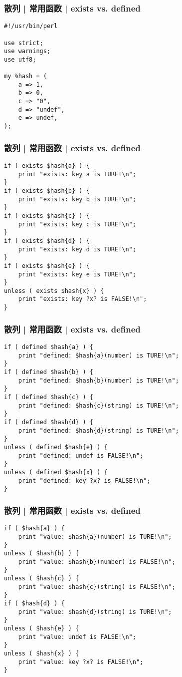 \begin{frame}[fragile]
  \frametitle{散列 | \alert{常用函数} | exists vs. defined}
\begin{lstlisting}
#!/usr/bin/perl 

use strict;
use warnings;
use utf8;

my %hash = (
    a => 1,
    b => 0,
    c => "0",
    d => "undef",
    e => undef,
);
\end{lstlisting}
\end{frame}

\begin{frame}[fragile]
  \frametitle{散列 | \alert{常用函数} | exists vs. defined}
  \vspace{-0.5em}
\begin{lstlisting}[basicstyle=\small\tt]
if ( exists $hash{a} ) {
    print "exists: key a is TURE!\n";
}
if ( exists $hash{b} ) {
    print "exists: key b is TURE!\n";
}
if ( exists $hash{c} ) {
    print "exists: key c is TURE!\n";
}
if ( exists $hash{d} ) {
    print "exists: key d is TURE!\n";
}
if ( exists $hash{e} ) {
    print "exists: key e is TURE!\n";
}
unless ( exists $hash{x} ) {
    print "exists: key ?x? is FALSE!\n";
}
\end{lstlisting}
\end{frame}

\begin{frame}[fragile]
  \frametitle{散列 | \alert{常用函数} | exists vs. defined}
  \vspace{-0.5em}
\begin{lstlisting}[basicstyle=\small\tt]
if ( defined $hash{a} ) {
    print "defined: $hash{a}(number) is TURE!\n";
}
if ( defined $hash{b} ) {
    print "defined: $hash{b}(number) is TURE!\n";
}
if ( defined $hash{c} ) {
    print "defined: $hash{c}(string) is TURE!\n";
}
if ( defined $hash{d} ) {
    print "defined: $hash{d}(string) is TURE!\n";
}
unless ( defined $hash{e} ) {
    print "defined: undef is FALSE!\n";
}
unless ( defined $hash{x} ) {
    print "defined: key ?x? is FALSE!\n";
}
\end{lstlisting}
\end{frame}

\begin{frame}[fragile]
  \frametitle{散列 | \alert{常用函数} | exists vs. defined}
  \vspace{-0.5em}
\begin{lstlisting}[basicstyle=\small\tt]
if ( $hash{a} ) {
    print "value: $hash{a}(number) is TURE!\n";
}
unless ( $hash{b} ) {
    print "value: $hash{b}(number) is FALSE!\n";
}
unless ( $hash{c} ) {
    print "value: $hash{c}(string) is FALSE!\n";
}
if ( $hash{d} ) {
    print "value: $hash{d}(string) is TURE!\n";
}
unless ( $hash{e} ) {
    print "value: undef is FALSE!\n";
}
unless ( $hash{x} ) {
    print "value: key ?x? is FALSE!\n";
}
\end{lstlisting}
\end{frame}


